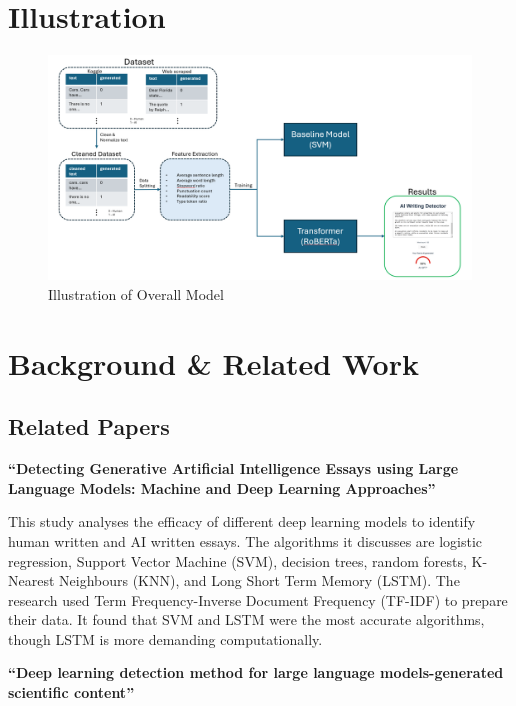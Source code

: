 \documentclass{article} %
\begin{document}
\section{Illustration}
\begin{figure}[htbp]
    \centering
    \includegraphics[width=0.9\linewidth]{illustrationFinal.png}
    \caption{Illustration of Overall Model} 
    \label{fig:pipeline}
\end{figure}

\section{Background \& Related Work}

\subsection{Related Papers}

\textbf{``Detecting Generative Artificial Intelligence Essays using Large Language Models: Machine and Deep Learning Approaches''}  ~\citep{Approaches}

This study analyses the efficacy of different deep learning models to identify human written and AI written essays. The algorithms it discusses are logistic regression, Support Vector Machine (SVM), decision trees, random forests, K-Nearest Neighbours (KNN), and Long Short Term Memory (LSTM). The research used Term Frequency-Inverse Document Frequency (TF-IDF) to prepare their data. It found that SVM and LSTM were the most accurate algorithms, though LSTM is more demanding computationally.

\textbf{``Deep learning detection method for large language models-generated scientific content''} ~\citep{DeepLearning2024}
\end{document}
